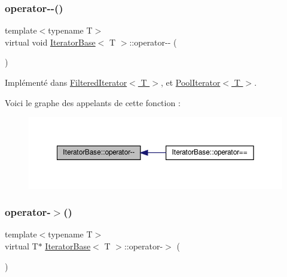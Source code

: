 \subsubsection{\texorpdfstring{operator-\/-\/()}{operator--()}}
{\footnotesize\ttfamily template$<$typename T$>$ \\
virtual void \hyperlink{class_iterator_base}{Iterator\+Base}$<$ T $>$\+::operator-\/-\/ (\begin{DoxyParamCaption}{ }\end{DoxyParamCaption})\hspace{0.3cm}{\ttfamily [pure virtual]}}



Implémenté dans \hyperlink{class_filtered_iterator_a860a37fdf31e87a96b80cb295e6d34c2}{Filtered\+Iterator$<$ T $>$}, et \hyperlink{class_pool_iterator_aa1f588a47b0c11d6e064e34b129337ae}{Pool\+Iterator$<$ T $>$}.

Voici le graphe des appelants de cette fonction \+:
\nopagebreak
\begin{figure}[H]
\begin{center}
\leavevmode
\includegraphics[width=350pt]{class_iterator_base_aa9bf0f75a8bb7e4d416a9b88ccacd9c7_icgraph}
\end{center}
\end{figure}
\mbox{\label{class_iterator_base_aad2254f7877e4647f699ceb455e893ff}} 
\subsubsection{\texorpdfstring{operator-\/$>$()}{operator->()}\hspace{0.1cm}{\footnotesize\ttfamily [1/2]}}
{\footnotesize\ttfamily template$<$typename T$>$ \\
virtual T$\ast$ \hyperlink{class_iterator_base}{Iterator\+Base}$<$ T $>$\+::operator-\/$>$ (\begin{DoxyParamCaption}{ }\end{DoxyParamCaption})\hspace{0.3cm}{\ttfamily [pure virtual]}}



